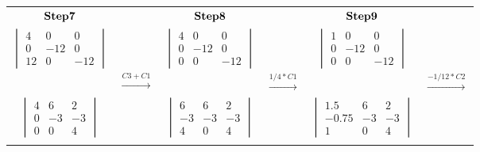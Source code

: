 \documentclass[]{article}
\begin{document}
\begin{tabular}{ c c c c c c }
$\bold{Step 7}$ &  & $\bold{Step 8}$  &  & $\bold{Step 9}$ \\
$\begin{vmatrix} 4 & 0 & 0\\ 0 & -12 & 0 \\ 12 & 0 & -12 \end{vmatrix}$ &  & $\begin{vmatrix} 4 & 0 & 0\\ 0 & -12 & 0 \\ 0 & 0 & -12 \end{vmatrix}$ &  & $\begin{vmatrix} 1 & 0 & 0\\ 0 & -12 & 0 \\ 0 & 0 & -12 \end{vmatrix}$ \\  
 & $\xrightarrow{C3+C1}$ &  & $\xrightarrow{1/4*C1}$ & & $\xrightarrow{-1/12*C2}$\\
$\begin{vmatrix} 4 &   6 &   2\\ 0 &   -3 &  -3 \\ 0 &   0 &   4 \end{vmatrix}$ &  & $\begin{vmatrix} 6 &   6 &   2\\ -3 &   -3 &   -3 \\ 4 &   0 &   4 \end{vmatrix}$ &  & $\begin{vmatrix} 1.5 &   6 &   2\\ -0.75 &   -3 &   -3\\ 1 &   0 &   4 \end{vmatrix}$\\
 &  &  \\
\end{tabular}

\endgroup

\hspace{3cm}

\begingroup
\end{document}
